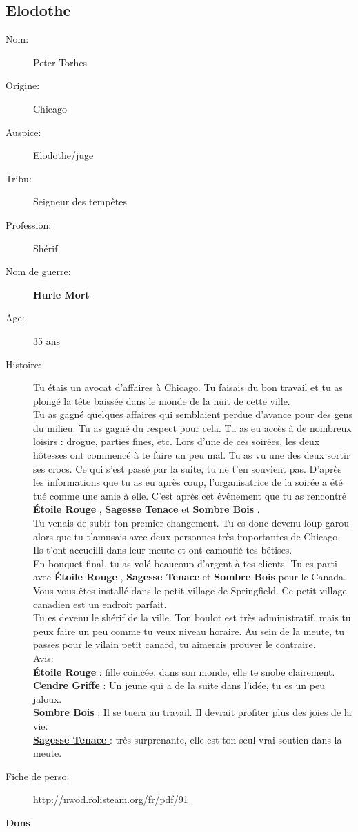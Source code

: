 \documentclass[oneside,12pt]{book}
\newcommand{\Lynn}{\textbf{Étoile Rouge} }
\newcommand{\Jessica}{\textbf{Sagesse Tenace} }
\newcommand{\Luke}{\textbf{Cendre Griffe} }
\newcommand{\Peter}{\textbf{Hurle Mort} }
\newcommand{\Leonard}{\textbf{Sombre Bois} }
\begin{document}
\begin{flushleft}
\section{Elodothe}
\begin{description}
\item[Nom:]{Peter Torhes}
\item[Origine:]{Chicago}
\item[Auspice:]{Elodothe/juge}
\item[Tribu:]{Seigneur des tempêtes}
\item[Profession:]{Shérif}
\item[Nom de guerre:]{\Peter}
\item[Age:]{35 ans}
\item[Histoire:]{
Tu étais un avocat d’affaires à Chicago. Tu faisais du bon travail et tu as plongé la tête baissée dans le monde de la nuit de cette ville.\\
Tu as gagné quelques affaires qui semblaient perdue d’avance pour des gens du milieu. Tu as gagné du respect pour cela. Tu as eu accès à de nombreux loisirs : drogue, parties fines, etc. Lors d’une de ces soirées, les deux hôtesses ont commencé à te faire un peu mal. Tu as vu une des deux sortir ses crocs. Ce qui s’est passé par la suite, tu ne t’en souvient pas. D’après les informations que tu as eu après coup, l’organisatrice de la soirée a été tué comme une amie à elle. C’est après cet événement que tu as rencontré \Lynn , \Jessica et \Leonard.\\
Tu venais de subir ton premier changement. Tu es donc devenu loup-garou alors que tu t’amusais avec deux personnes très importantes de Chicago.\\
 Ils t’ont accueilli dans leur meute et ont camouflé tes bêtises. \\
En bouquet final, tu as volé beaucoup d'argent à tes clients. 
Tu es parti avec \Lynn, \Jessica et \Leonard pour le Canada. Vous vous êtes installé dans le petit village de Springfield. Ce petit village canadien est un endroit parfait. \\
Tu es devenu le shérif de la ville. Ton boulot est très administratif, mais tu peux faire un peu comme tu veux niveau horaire. 
Au sein de la meute, tu passes pour le vilain petit canard, tu aimerais prouver le contraire. \\

Avis:\\
\underline{\Lynn} : fille coincée, dans son monde, elle te snobe clairement.\\
\underline{\Luke} : Un jeune qui a de la suite dans l'idée, tu es un peu jaloux.\\
\underline{\Leonard} : Il se tuera au travail. Il devrait profiter plus des joies de la vie.\\
\underline{\Jessica} : très surprenante, elle est ton seul vrai soutien dans la meute. \\
}
\item[Fiche de perso:]{\href{http://nwod.rolisteam.org/fr/pdf/91}{http://nwod.rolisteam.org/fr/pdf/91}}
\end{description}
\clearpage
\textbf{\large Dons} 
\vspace{0.5cm}


\end{flushleft}
\end{document}
